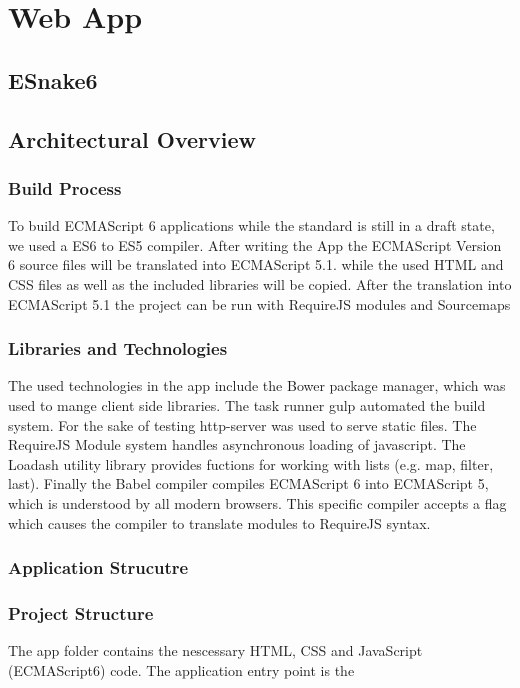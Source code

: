 \documentclass{bioinfo}
\begin{document}
\section{Web App}

\subsection{ESnake6}

\subsection{Architectural Overview}
\subsubsection{Build Process}
To build ECMAScript 6 applications while the standard is still in a draft state, we used a ES6 to ES5 compiler.
After writing the App the ECMAScript Version 6 source files will be translated into ECMAScript 5.1. while the 
used HTML and CSS files as well as the included libraries will be copied. After the translation into ECMAScript 5.1
the project can be run with RequireJS modules and Sourcemaps %
\subsubsection{Libraries and Technologies}
The used technologies in the app include the Bower package manager, which was used to mange client side libraries. The task runner gulp automated the build system.
For the sake of testing http-server was used to serve static files. The RequireJS Module system handles asynchronous loading of javascript. The Loadash utility library
provides fuctions for working with lists (e.g. map, filter, last). Finally the Babel compiler compiles ECMAScript 6 into ECMAScript 5, which is understood by all modern browsers.
This specific compiler accepts a flag which causes the compiler to translate modules to RequireJS syntax.
\subsubsection{Application Strucutre}
\subsubsection{Project Structure} 
The app folder contains the nescessary HTML, CSS and JavaScript (ECMAScript6) code. The application entry point is the 
\end{document}
